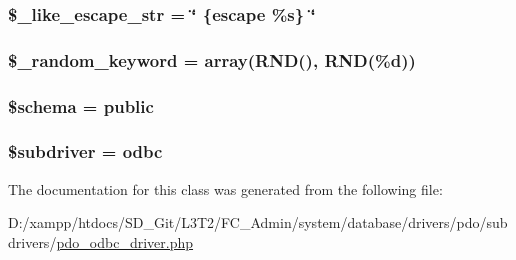 \subsubsection[{\$\+\_\+like\+\_\+escape\+\_\+str}]{\setlength{\rightskip}{0pt plus 5cm}\$\+\_\+like\+\_\+escape\+\_\+str = \char`\"{} \{escape \textquotesingle{}\%s\textquotesingle{}\} \char`\"{}\hspace{0.3cm}{\ttfamily [protected]}}\label{class_c_i___d_b__pdo__odbc__driver_adf86ecadf3d0e1ce3f5e0eaeeb3867ae}
\hypertarget{class_c_i___d_b__pdo__odbc__driver_a10213aa6e05f6d924d3277bb1d2fea00}{}
\subsubsection[{\$\+\_\+random\+\_\+keyword}]{\setlength{\rightskip}{0pt plus 5cm}\$\+\_\+random\+\_\+keyword = array(\textquotesingle{}R\+N\+D()\textquotesingle{}, \textquotesingle{}R\+N\+D(\%{\bf d})\textquotesingle{})\hspace{0.3cm}{\ttfamily [protected]}}\label{class_c_i___d_b__pdo__odbc__driver_a10213aa6e05f6d924d3277bb1d2fea00}
\hypertarget{class_c_i___d_b__pdo__odbc__driver_a83022b1d70799d2bde3d64dca9cb40ee}{}
\subsubsection[{\$schema}]{\setlength{\rightskip}{0pt plus 5cm}\$schema = \textquotesingle{}public\textquotesingle{}}\label{class_c_i___d_b__pdo__odbc__driver_a83022b1d70799d2bde3d64dca9cb40ee}
\hypertarget{class_c_i___d_b__pdo__odbc__driver_a1322ca756348b11d080cb7a4f590de15}{}
\subsubsection[{\$subdriver}]{\setlength{\rightskip}{0pt plus 5cm}\$subdriver = \textquotesingle{}odbc\textquotesingle{}}\label{class_c_i___d_b__pdo__odbc__driver_a1322ca756348b11d080cb7a4f590de15}


The documentation for this class was generated from the following file\+:\begin{DoxyCompactItemize}
\item 
D\+:/xampp/htdocs/\+S\+D\+\_\+\+Git/\+L3\+T2/\+F\+C\+\_\+\+Admin/system/database/drivers/pdo/subdrivers/\hyperlink{pdo__odbc__driver_8php}{pdo\+\_\+odbc\+\_\+driver.\+php}\end{DoxyCompactItemize}
